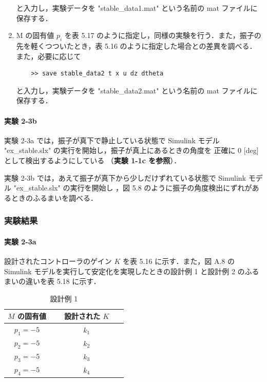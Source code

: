 \begin{enumerate}
        と入力し，実験データを "stable\_data1.mat" という名前の mat ファイルに保存する．
        
  \item M の固有値 \( p_i \) を表 5.17 のように指定し，同様の実験を行う．また，振子の先を軽くつついたとき，表 5.16 のように指定した場合との差異を調べる．また，必要に応じて
        
        \begin{tcolorbox}[colback=gray!5!white,colframe=gray!75!black]
          \begin{lstlisting}
    >> save stable_data2 t x u dz dtheta
    \end{lstlisting}
        \end{tcolorbox}
        
        と入力し，実験データを "stable\_data2.mat" という名前の mat ファイルに保存する．
\end{enumerate}

\paragraph{実験 2-3b}
実験 2-3a では，振子が真下で静止している状態で Simulink モデル 
"ex\_stable.slx" の実行を開始し，振子が真上にあるときの角度を
正確に 0 [deg] として検出するようにしている
（\textbf{実験 1-1c を参照}）．

実験 2-3b では，あえて振子が真下から少しだけずれている状態で
Simulink モデル "ex\_stable.slx" の実行を開始し
，図 5.8 のように振子の角度検出にずれがあるときのふるまいを調べる．

\subsubsection{実験結果}

\paragraph{実験 2-3a}
設計されたコントローラのゲイン \( K \) を表 5.16 に示す．また，図 A.8 の Simulink モデルを実行して安定化を実現したときの設計例 1 と設計例 2 のふるまいの違いを表 5.18 に示す．

\begin{table}[h]
  \centering
  \caption{設計例 1}
  \label{tab:design_example_1}
  \begin{tabular}{|c|c|}
    \hline
    \( M \) の固有値 & 設計された \( K \)                           \\
    \hline
    \( p_1 = -5 \)   & \( k_1 \) {\large\textbf{　　　　　　　　}}  \\
    \( p_2 = -5 \)   & \( k_2 \) {\large\textbf{　　　　　　　　}}  \\
    \( p_3 = -5 \)   & \( k_3 \)  {\large\textbf{　　　　　　　　}} \\
    \( p_4 = -5 \)   & \( k_4 \)  {\large\textbf{　　　　　　　　}} \\
    \hline
  \end{tabular}
\end{table}


